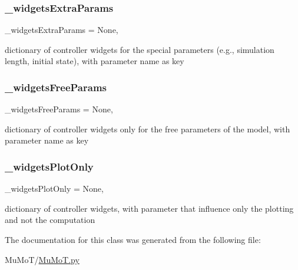 \subsubsection{\texorpdfstring{\+\_\+widgets\+Extra\+Params}{\_widgetsExtraParams}}
{\footnotesize\ttfamily \+\_\+widgets\+Extra\+Params = None\hspace{0.3cm}{\ttfamily [static]}, {\ttfamily [private]}}



dictionary of controller widgets for the special parameters (e.\+g., simulation length, initial state), with parameter name as key 

\mbox{\label{class_mu_mo_t_1_1_mu_mo_t_1_1_mu_mo_tcontroller_aab884266838b2bf42f4ff27cc2041464}} 
\subsubsection{\texorpdfstring{\+\_\+widgets\+Free\+Params}{\_widgetsFreeParams}}
{\footnotesize\ttfamily \+\_\+widgets\+Free\+Params = None\hspace{0.3cm}{\ttfamily [static]}, {\ttfamily [private]}}



dictionary of controller widgets only for the free parameters of the model, with parameter name as key 

\mbox{\label{class_mu_mo_t_1_1_mu_mo_t_1_1_mu_mo_tcontroller_af54e883f58d2be155299935e0bf427cb}} 
\subsubsection{\texorpdfstring{\+\_\+widgets\+Plot\+Only}{\_widgetsPlotOnly}}
{\footnotesize\ttfamily \+\_\+widgets\+Plot\+Only = None\hspace{0.3cm}{\ttfamily [static]}, {\ttfamily [private]}}



dictionary of controller widgets, with parameter that influence only the plotting and not the computation 



The documentation for this class was generated from the following file\+:\begin{DoxyCompactItemize}
\item 
Mu\+Mo\+T/\hyperlink{_mu_mo_t_8py}{Mu\+Mo\+T.\+py}\end{DoxyCompactItemize}
